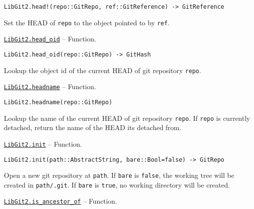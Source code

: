 \begin{adjustwidth}{2em}{0pt}


\begin{verbatim}
LibGit2.head!(repo::GitRepo, ref::GitReference) -> GitReference
\end{verbatim}

Set the HEAD of \texttt{repo} to the object pointed to by \texttt{ref}.



\end{adjustwidth}
\hypertarget{15860910592870539871}{}
\hyperlink{15860910592870539871}{\texttt{LibGit2.head\_oid}}  -- {Function.}

\begin{adjustwidth}{2em}{0pt}


\begin{verbatim}
LibGit2.head_oid(repo::GitRepo) -> GitHash
\end{verbatim}

Lookup the object id of the current HEAD of git repository \texttt{repo}.



\end{adjustwidth}
\hypertarget{9819416665219430137}{}
\hyperlink{9819416665219430137}{\texttt{LibGit2.headname}}  -- {Function.}

\begin{adjustwidth}{2em}{0pt}


\begin{verbatim}
LibGit2.headname(repo::GitRepo)
\end{verbatim}

Lookup the name of the current HEAD of git repository \texttt{repo}. If \texttt{repo} is currently detached, return the name of the HEAD it{\textquotesingle}s detached from.



\end{adjustwidth}
\hypertarget{234151039133609684}{}
\hyperlink{234151039133609684}{\texttt{LibGit2.init}}  -- {Function.}

\begin{adjustwidth}{2em}{0pt}


\begin{verbatim}
LibGit2.init(path::AbstractString, bare::Bool=false) -> GitRepo
\end{verbatim}

Open a new git repository at \texttt{path}. If \texttt{bare} is \texttt{false}, the working tree will be created in \texttt{path/.git}. If \texttt{bare} is \texttt{true}, no working directory will be created.



\end{adjustwidth}
\hypertarget{330281650028652704}{}
\hyperlink{330281650028652704}{\texttt{LibGit2.is\_ancestor\_of}}  -- {Function.}

